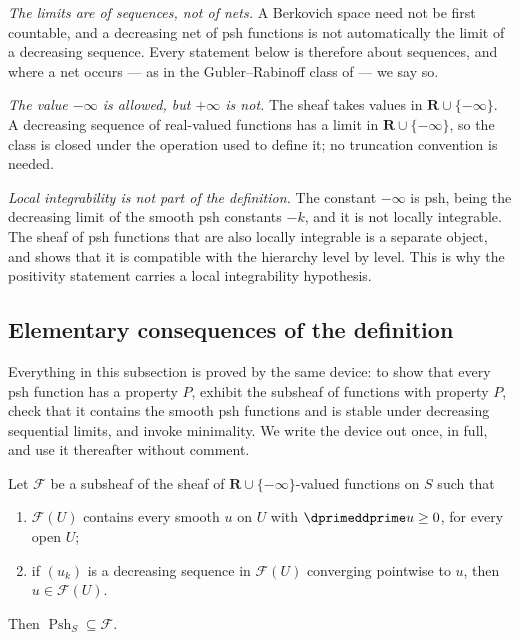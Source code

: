 \emph{The limits are of sequences, not of nets.}  A Berkovich space need not
be first countable, and a decreasing net of psh functions is not
automatically the limit of a decreasing sequence.  Every statement below is
therefore about sequences, and where a net occurs --- as in the
Gubler--Rabinoff class of  --- we say so.

\emph{The value $-\infty$ is allowed, but $+\infty$ is not.}  The sheaf takes
values in $\mathbf R\cup\{-\infty\}$.  A decreasing sequence of real-valued
functions has a limit in $\mathbf R\cup\{-\infty\}$, so the class is closed
under the operation used to define it; no truncation convention is needed.

\emph{Local integrability is not part of the definition.}  The constant
$-\infty$ is psh, being the decreasing limit of the smooth psh constants
$-k$, and it is not locally integrable.  The sheaf of psh functions that are
also locally integrable is a separate object, and
 shows that it is compatible with the hierarchy
level by level.  This is why the positivity statement
 carries a local integrability
hypothesis.

\subsection{Elementary consequences of the definition}
\label{sec:ch15-psh-elementary}

Everything in this subsection is proved by the same device: to show that
every psh function has a property $P$, exhibit the subsheaf of functions with
property $P$, check that it contains the smooth psh functions and is stable
under decreasing sequential limits, and invoke minimality.  We write the
device out once, in full, and use it thereafter without comment.

\begin{lemma}
\label{lem:ch15-minimality}
Let $\mathscr F$ be a subsheaf of the sheaf of
$\mathbf R\cup\{-\infty\}$-valued functions on $S$ such that
\begin{enumerate}
\item $\mathscr F(U)$ contains every smooth $u$ on $U$ with
  $\dprimeddprime u\ge0$, for every open $U$;
\item if $(u_k)$ is a decreasing sequence in $\mathscr F(U)$ converging
  pointwise to $u$, then $u\in\mathscr F(U)$.
\end{enumerate}
Then $\operatorname{Psh}_S\subseteq\mathscr F$.
\end{lemma}

